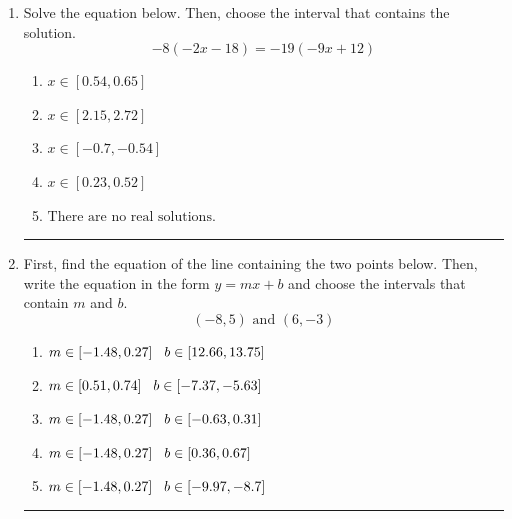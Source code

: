 \documentclass[14pt]{extbook}
\newcommand{\litem}[1]{\item#1\hspace*{-1cm}\rule{\textwidth}{0.4pt}}
\begin{document}
\begin{enumerate}
{\begin{enumerate}[label=\Alph*.]
\end{enumerate} }
\litem{
Solve the equation below. Then, choose the interval that contains the solution.\[ -8(-2x -18) = -19(-9x + 12) \]\begin{enumerate}[label=\Alph*.]
\item \( x \in [0.54, 0.65] \)
\item \( x \in [2.15, 2.72] \)
\item \( x \in [-0.7, -0.54] \)
\item \( x \in [0.23, 0.52] \)
\item \( \text{There are no real solutions.} \)

\end{enumerate} }
\litem{
First, find the equation of the line containing the two points below. Then, write the equation in the form $ y=mx+b $ and choose the intervals that contain $m$ and $b$.\[ (-8, 5) \text{ and } (6, -3) \]\begin{enumerate}[label=\Alph*.]
\item \( m \in [-1.48, 0.27] \hspace*{3mm} b \in [12.66, 13.75] \)
\item \( m \in [0.51, 0.74] \hspace*{3mm} b \in [-7.37, -5.63] \)
\item \( m \in [-1.48, 0.27] \hspace*{3mm} b \in [-0.63, 0.31] \)
\item \( m \in [-1.48, 0.27] \hspace*{3mm} b \in [0.36, 0.67] \)
\item \( m \in [-1.48, 0.27] \hspace*{3mm} b \in [-9.97, -8.7] \)


\end{enumerate}}
\end{enumerate}
\end{document}
